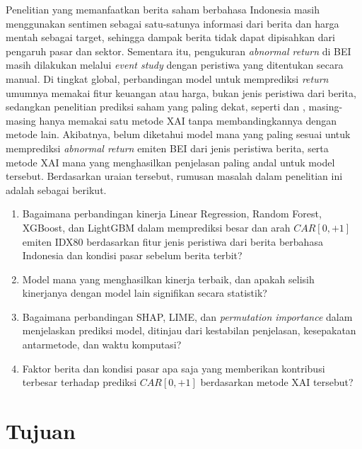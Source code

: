 Penelitian yang memanfaatkan berita saham berbahasa Indonesia masih menggunakan sentimen sebagai satu-satunya informasi dari berita dan harga mentah sebagai target, sehingga dampak berita tidak dapat dipisahkan dari pengaruh pasar dan sektor. Sementara itu, pengukuran \emph{abnormal return} di BEI masih dilakukan melalui \emph{event study} dengan peristiwa yang ditentukan secara manual. Di tingkat global, perbandingan model untuk memprediksi \emph{return} umumnya memakai fitur keuangan atau harga, bukan jenis peristiwa dari berita, sedangkan penelitian prediksi saham yang paling dekat, seperti \textcite{ruan2025} dan \textcite{gite2021}, masing-masing hanya memakai satu metode XAI tanpa membandingkannya dengan metode lain. Akibatnya, belum diketahui model mana yang paling sesuai untuk memprediksi \emph{abnormal return} emiten BEI dari jenis peristiwa berita, serta metode XAI mana yang menghasilkan penjelasan paling andal untuk model tersebut. Berdasarkan uraian tersebut, rumusan masalah dalam penelitian ini adalah sebagai berikut.
\begin{enumerate}
    \item Bagaimana perbandingan kinerja Linear Regression, Random Forest, XGBoost, dan LightGBM dalam memprediksi besar dan arah $CAR[0,+1]$ emiten IDX80 berdasarkan fitur jenis peristiwa dari berita berbahasa Indonesia dan kondisi pasar sebelum berita terbit?
    \item Model mana yang menghasilkan kinerja terbaik, dan apakah selisih kinerjanya dengan model lain signifikan secara statistik?
    \item Bagaimana perbandingan SHAP, LIME, dan \emph{permutation importance} dalam menjelaskan prediksi model, ditinjau dari kestabilan penjelasan, kesepakatan antarmetode, dan waktu komputasi?
    \item Faktor berita dan kondisi pasar apa saja yang memberikan kontribusi terbesar terhadap prediksi $CAR[0,+1]$ berdasarkan metode XAI tersebut?
\end{enumerate}

\section{Tujuan}

